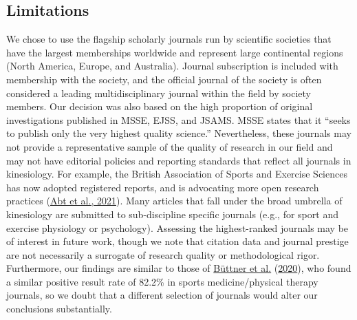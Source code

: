 \documentclass[]{cik}%
\begin{document}
\hypertarget{limitations}{%
\subsection{Limitations}\label{limitations}}

We chose to use the flagship scholarly journals run by scientific
societies that have the largest memberships worldwide and represent
large continental regions (North America, Europe, and Australia).
Journal subscription is included with membership with the society, and
the official journal of the society is often considered a leading
multidisciplinary journal within the field by society members. Our
decision was also based on the high proportion of original
investigations published in MSSE, EJSS, and JSAMS. MSSE states that it
``seeks to publish only the very highest quality science.''
Nevertheless, these journals may not provide a representative sample of
the quality of research in our field and may not have editorial policies
and reporting standards that reflect all journals in kinesiology. For
example, the British Association of Sports and Exercise Sciences has now
adopted registered reports, and is advocating more open research
practices (\protect\hyperlink{ref-abt2021}{Abt et al., 2021}). Many
articles that fall under the broad umbrella of kinesiology are submitted
to sub-discipline specific journals (e.g., for sport and exercise
physiology or psychology). Assessing the highest-ranked journals may be
of interest in future work, though we note that citation data and
journal prestige are not necessarily a surrogate of research quality or
methodological rigor. Furthermore, our findings are similar to those of
\protect\hyperlink{ref-buttner_2020}{Büttner et al.}
(\protect\hyperlink{ref-buttner_2020}{2020}), who found a similar
positive result rate of 82.2\% in sports medicine/physical therapy
journals, so we doubt that a different selection of journals would alter
our conclusions substantially.
\end{document}
